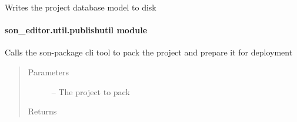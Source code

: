 \documentclass[letterpaper,10pt,english]{sphinxmanual}
\begin{document}

\begin{fulllineitems}
\label{_source/son_editor.util:son_editor.util.descriptorutil.write_private_descriptor}
\end{fulllineitems}


\begin{fulllineitems}
\label{_source/son_editor.util:son_editor.util.descriptorutil.write_project_descriptor}
Writes the project database model to disk

\end{fulllineitems}



\paragraph{son\_editor.util.publishutil module}
\label{_source/son_editor.util:son-editor-util-publishutil-module}\label{_source/son_editor.util:module-son_editor.util.publishutil}

\begin{fulllineitems}
\label{_source/son_editor.util:son_editor.util.publishutil.pack_project}
Calls the son-package cli tool to pack the project and prepare it for deployment
\begin{quote}\begin{description}
\item[{Parameters}] \leavevmode
{} -- The project to pack

\item[{Returns}] \leavevmode


\end{description}\end{quote}

\end{fulllineitems}
\end{document}
